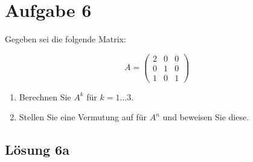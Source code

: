 \documentclass[main.tex]{subfiles}
\begin{document}
\section{Aufgabe 6}
Gegeben sei die folgende Matrix:

\begin{equation*}
    A = \begin{pmatrix}
        2 & 0 & 0 \\
        0 & 1 & 0 \\
        1 & 0 & 1
    \end{pmatrix}
\end{equation*}

\begin{enumerate}
    \item Berechnen Sie $A^k$ für $k=1 \ldots 3$.
    \item Stellen Sie eine Vermutung auf für $A^n$ und beweisen Sie diese.
\end{enumerate}

\subsection{Lösung 6a}
\end{document}
